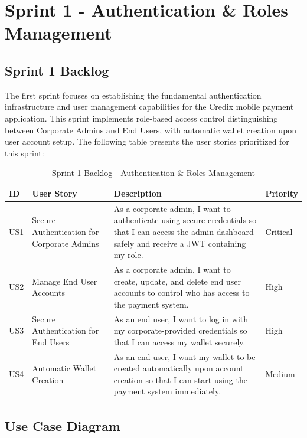 \section{Sprint 1 - Authentication \& Roles Management}

\subsection{Sprint 1 Backlog}

The first sprint focuses on establishing the fundamental authentication infrastructure and user management capabilities for the Credix mobile payment application. This sprint implements role-based access control distinguishing between Corporate Admins and End Users, with automatic wallet creation upon user account setup. The following table presents the user stories prioritized for this sprint:

\begin{table}[!htbp]
  \centering
  \small
  \caption{Sprint 1 Backlog - Authentication \& Roles Management}
  \label{tab:sprint1_backlog}
  \begin{tabular}{|p{1.5cm}|p{3.5cm}|p{7cm}|p{2cm}|}
    \hline
    \textbf{ID} & \textbf{User Story} & \textbf{Description} & \textbf{Priority} \\ \hline
    US1 & Secure Authentication for Corporate Admins  
      & As a corporate admin, I want to authenticate using secure credentials so that I can access the admin dashboard safely and receive a JWT containing my role.  
      & Critical \\ \hline
    US2 & Manage End User Accounts  
      & As a corporate admin, I want to create, update, and delete end user accounts to control who has access to the payment system.  
      & High \\ \hline
    US3 & Secure Authentication for End Users  
      & As an end user, I want to log in with my corporate-provided credentials so that I can access my wallet securely.  
      & High \\ \hline
    US4 & Automatic Wallet Creation  
      & As an end user, I want my wallet to be created automatically upon account creation so that I can start using the payment system immediately.  
      & Medium \\ \hline
  \end{tabular}
\end{table}

\subsection{Use Case Diagram}

